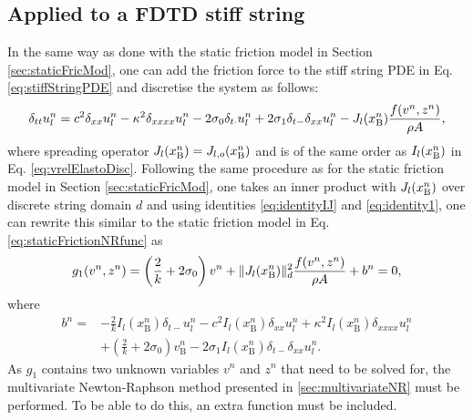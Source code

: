 \subsection{Applied to a FDTD stiff string}
In the same way as done with the static friction model in Section \ref{sec:staticFricMod}, one can add the friction force to the stiff string PDE in Eq. \eqref{eq:stiffStringPDE} and discretise the system as follows:
%
\begin{equation}\label{eq:elastoStiffStringFDS}
    \delta_{tt} u_l^n = c^2 \delta_{xx} u_l^n - \kappa^2 \delta_{xxxx} u_l^n - 2 \sigma_{0} \delta_{t\cdot} u_l^n + 2 \sigma_{1}\delta_{t-}\delta_{xx} u_l^n - J_l(x_{\text{B}}^n)\frac{f(v^n,z^n)}{\rho A},
\end{equation}
where spreading operator $J_l(x_{\text{B}}^n) = J_{l,o}(x_{\text{B}}^n)$ and is of the same order as $I_l(x_{\text{B}}^n)$ in Eq. \eqref{eq:vrelElastoDisc}. Following the same procedure as for the static friction model in Section \ref{sec:staticFricMod}, one takes an inner product with $J_l(x_{\text{B}}^n)$ over discrete string domain $d$ and using identities \eqref{eq:identityIJ} and \eqref{eq:identity1}, one can rewrite this similar to the static friction model in Eq. \eqref{eq:staticFrictionNRfunc} as
%
\begin{equation}\label{eq:elastog1}
    g_1(v^n,z^n) = \left(\frac{2}{k} + 2\sigma_{0}\right)v^n + \lVert J_l(x_{\text{B}}^n)\rVert_d^2\frac{f(v^n,z^n)}{\rho A}+ b^n= 0,
\end{equation}
where
\begin{align*}
    b^n =&-\frac{2}{k}I_l(x_\text{B}^n)\delta_{t-}u_l^n - c^2 I_l(x_\text{B}^n)\delta_{xx} u_l^n +\kappa^2I_l(x_\text{B}^n)\delta_{xxxx} u_l^n\\
    &+\left(\frac{2}{k}+ 2\sigma_0\right)v_\text{B}^n-2\sigma_1I_l(x_\text{B}^n)\delta_{t-}\delta_{xx}u_l^n.
\end{align*}
As $g_1$ contains two unknown variables $v^n$ and $z^n$ that need to be solved for, the multivariate Newton-Raphson method presented in \ref{sec:multivariateNR} must be performed. To be able to do this, an extra function must be included. 

